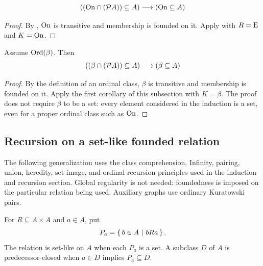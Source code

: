\begin{corollary}
\[
((\mathrm{On}\cap(\mathcal{P} A))\subseteq A)
\longrightarrow
(\mathrm{On}\subseteq A)
\]
\end{corollary}
\begin{proof}
By , $\mathrm{On}$ is transitive and membership is founded
on it. Apply  with $R=\mathrm{E}$ and $K=\mathrm{On}$.
\end{proof}
\begin{corollary}
Assume $\mathrm{Ord}(\beta)$. Then
\[
((\beta\cap(\mathcal{P} A))\subseteq A)
\longrightarrow
(\beta\subseteq A)
\]
\end{corollary}
\begin{proof}
By the definition of an ordinal class, $\beta$ is transitive and
membership is founded on it. Apply the first corollary of this subsection
with $K=\beta$. The proof does not require $\beta$ to be a set: every
element considered in the induction is a set, even for a proper ordinal
class such as $\mathrm{On}$.
\end{proof}


\subsection{Recursion on a set-like founded relation}
The following generalization uses the class comprehension, Infinity,
pairing, union, heredity, set-image, and ordinal-recursion principles used
in the induction and recursion section. Global regularity is not needed:
foundedness is imposed on the particular relation being used. Auxiliary
graphs use ordinary Kuratowski pairs.

\begin{definition}
For $R\subseteq A\times A$ and $a\in A$, put
\[
P_a=\left\{\,b\in A\ \middle|\ bRa\,\right\}.
\]
The relation is set-like on $A$ when each $P_a$ is a set. A subclass $D$
of $A$ is predecessor-closed when $a\in D$ implies $P_a\subseteq D$.
\end{definition}

